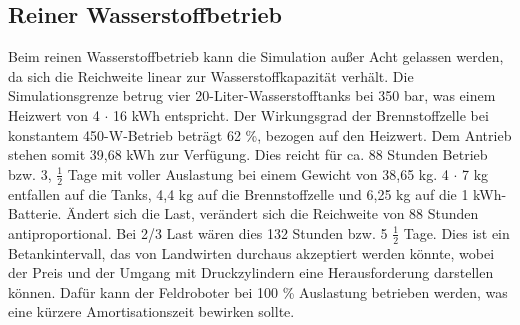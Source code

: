 \subsection{Reiner Wasserstoffbetrieb}
Beim reinen Wasserstoffbetrieb kann die Simulation außer Acht gelassen werden, da sich die Reichweite linear zur Wasserstoffkapazität verhält.
Die Simulationsgrenze betrug vier 20-Liter-Wasserstofftanks bei 350 bar, was einem Heizwert von 4 $\cdot$ 16 kWh entspricht. 
Der Wirkungsgrad der Brennstoffzelle bei konstantem 450-W-Betrieb beträgt 62 \%, bezogen auf den Heizwert. Dem Antrieb stehen somit 39,68 kWh zur Verfügung. Dies reicht für ca. 88 Stunden Betrieb bzw. 3, $\frac{1}{2}$ Tage mit voller Auslastung bei einem Gewicht von 38,65 kg.  4 $\cdot$ 7 kg entfallen auf die Tanks, 4,4 kg auf die Brennstoffzelle und 6,25 kg auf die 1 kWh-Batterie.
Ändert sich die Last, verändert sich die Reichweite von 88 Stunden antiproportional. Bei 2/3 Last wären dies 132 Stunden bzw. 5 $\frac{1}{2}$ Tage. Dies ist ein Betankintervall, das von Landwirten durchaus akzeptiert werden könnte, wobei der Preis und der Umgang mit Druckzylindern eine Herausforderung darstellen können. 
Dafür kann der Feldroboter bei 100 \% Auslastung betrieben werden, was eine kürzere Amortisationszeit bewirken sollte.

